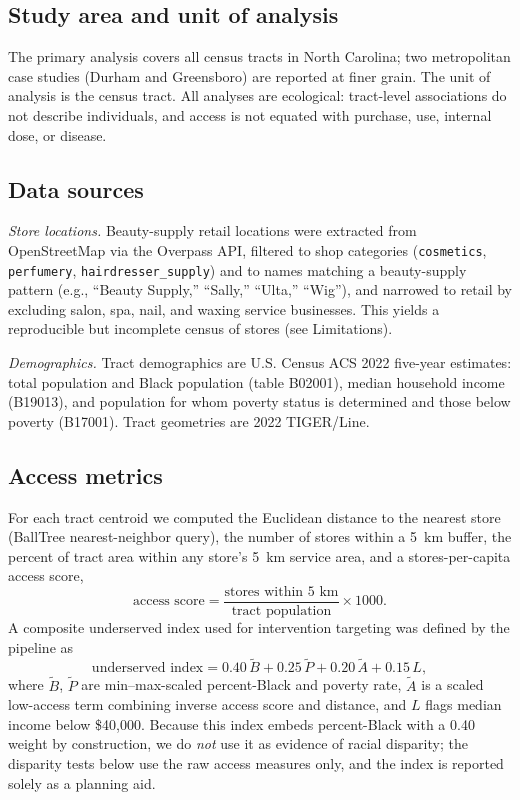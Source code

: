 \documentclass[12pt,letterpaper]{article}
\begin{document}
\subsection{Study area and unit of analysis}

The primary analysis covers all census tracts in North Carolina; two
metropolitan case studies (Durham and Greensboro) are reported at finer grain.
The unit of analysis is the census tract. All analyses are ecological:
tract-level associations do not describe individuals, and access is not equated
with purchase, use, internal dose, or disease.

\subsection{Data sources}

\emph{Store locations.} Beauty-supply retail locations were extracted from
OpenStreetMap via the Overpass API, filtered to shop categories
(\texttt{cosmetics}, \texttt{perfumery}, \texttt{hairdresser\_supply}) and to
names matching a beauty-supply pattern (e.g., ``Beauty Supply,'' ``Sally,''
``Ulta,'' ``Wig''), and narrowed to retail by excluding salon, spa, nail, and
waxing service businesses. This yields a reproducible but incomplete census of
stores (see Limitations).

\emph{Demographics.} Tract demographics are U.S. Census ACS 2022 five-year
estimates: total population and Black population (table B02001), median
household income (B19013), and population for whom poverty status is determined
and those below poverty (B17001). Tract geometries are 2022 TIGER/Line.

\subsection{Access metrics}

For each tract centroid we computed the Euclidean distance to the nearest store
(BallTree nearest-neighbor query), the number of stores within a 5~km buffer,
the percent of tract area within any store's 5~km service area, and a
stores-per-capita access score,
\begin{equation}
\text{access score} = \frac{\text{stores within 5 km}}{\text{tract population}}\times 1000 .
\end{equation}
A composite underserved index used for intervention targeting was defined by the
pipeline as
\begin{equation}
\text{underserved index} = 0.40\,\widetilde{B} + 0.25\,\widetilde{P}
 + 0.20\,\widetilde{A} + 0.15\,L,
\end{equation}
where $\widetilde{B}$, $\widetilde{P}$ are min--max-scaled percent-Black and
poverty rate, $\widetilde{A}$ is a scaled low-access term combining inverse
access score and distance, and $L$ flags median income below \$40{,}000. Because
this index embeds percent-Black with a 0.40 weight by construction, we do
\emph{not} use it as evidence of racial disparity; the disparity tests below use
the raw access measures only, and the index is reported solely as a planning
aid.
\end{document}
